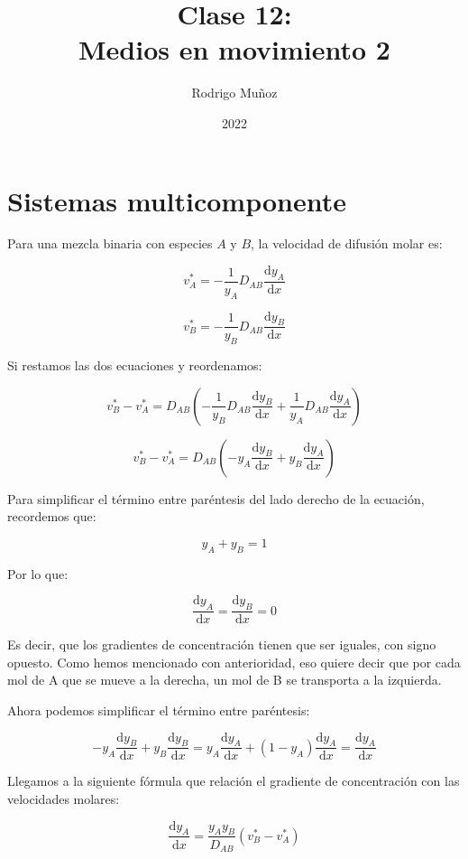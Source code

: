\documentclass[11pt]{article}
\title{Clase 12: \\ Medios en movimiento 2}
\author{Rodrigo Muñoz}
\date{2022}
\begin{document}
\maketitle

\section{Sistemas multicomponente}

Para una mezcla binaria con especies \( A \) y \( B \), la velocidad de difusión molar es:

\[ v_{A}^{*} = - \frac{1}{y_A} D_{AB} \frac{ \mathrm d y_A }{ \mathrm d x } \]

\[ v_{B}^{*} = - \frac{1}{y_B} D_{AB} \frac{ \mathrm d y_B }{ \mathrm d x } \]

Si restamos las dos ecuaciones y reordenamos:

\[ v_{B}^{*} - v_{A}^{*} = D_{AB} \left( - \frac{1}{y_B} D_{AB} \frac{ \mathrm d y_B }{ \mathrm d x } + \frac{1}{y_A} D_{AB} \frac{ \mathrm d y_A }{ \mathrm d x } \right) \]

\[ v_{B}^{*} - v_{A}^{*} = D_{AB} \left( - y_A \frac{ \mathrm d y_B }{ \mathrm d x } + y_B \frac{ \mathrm d y_A }{ \mathrm d x } \right) \]

Para simplificar el término entre paréntesis del lado derecho de la ecuación, recordemos que:

\[ y_A + y_B = 1 \]

Por lo que:

\[ \frac{ \mathrm d y_A }{ \mathrm d x } = \frac{ \mathrm d y_B }{ \mathrm d x } = 0 \]

Es decir, que los gradientes de concentración tienen que ser iguales, con signo opuesto. Como hemos mencionado con anterioridad, eso quiere decir que por cada mol de A que se mueve a la derecha, un mol de B se transporta a la izquierda.

Ahora podemos simplificar el término entre paréntesis:

\[ - y_A \frac{ \mathrm d y_B }{ \mathrm d x } + y_B \frac{ \mathrm d y_B }{ \mathrm d x } = y_A \frac{ \mathrm d y_A }{ \mathrm d x } + \left( 1 - y_A \right) \frac{ \mathrm d y_A }{ \mathrm d x } = \frac{ \mathrm d y_A }{ \mathrm d x } \]

Llegamos a la siguiente fórmula que relación el gradiente de concentración con las velocidades molares:

\[ \boxed{ \frac{ \mathrm d y_A }{ \mathrm d x } = \frac{ y_A y_B }{ D_{AB} } \left( v_{B}^{*} - v_{A}^{*} \right) } \]
\end{document}
